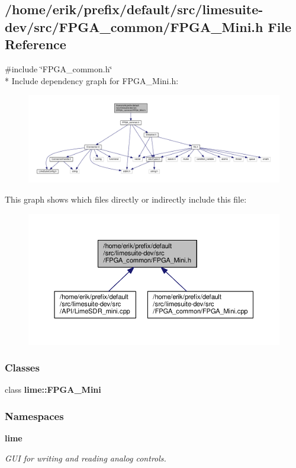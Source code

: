 \subsection{/home/erik/prefix/default/src/limesuite-\/dev/src/\+F\+P\+G\+A\+\_\+common/\+F\+P\+G\+A\+\_\+\+Mini.h File Reference}
\label{FPGA__Mini_8h}
{\ttfamily \#include \char`\"{}F\+P\+G\+A\+\_\+common.\+h\char`\"{}}\\*
Include dependency graph for F\+P\+G\+A\+\_\+\+Mini.\+h\+:
\nopagebreak
\begin{figure}[H]
\begin{center}
\leavevmode
\includegraphics[width=350pt]{d9/d41/FPGA__Mini_8h__incl}
\end{center}
\end{figure}
This graph shows which files directly or indirectly include this file\+:
\nopagebreak
\begin{figure}[H]
\begin{center}
\leavevmode
\includegraphics[width=350pt]{dc/df1/FPGA__Mini_8h__dep__incl}
\end{center}
\end{figure}
\subsubsection*{Classes}
\begin{DoxyCompactItemize}
\item 
class {\bf lime\+::\+F\+P\+G\+A\+\_\+\+Mini}
\end{DoxyCompactItemize}
\subsubsection*{Namespaces}
\begin{DoxyCompactItemize}
\item 
 {\bf lime}
\begin{DoxyCompactList}\small\item\em G\+UI for writing and reading analog controls. \end{DoxyCompactList}\end{DoxyCompactItemize}
